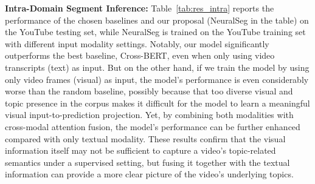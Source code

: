 \documentclass[runningheads]{llncs}
\begin{document}
\textbf{Intra-Domain Segment Inference: }Table~\ref{tab:res_intra} reports the performance of the chosen
baselines and our proposal (NeuralSeg in the table) on the YouTube testing set, while
NeuralSeg is trained on the YouTube training set with different input modality settings.
Notably, our model significantly outperforms the best baseline, Cross-BERT, even when only using video transcripts (text) as input. But on the other hand, if we train the model by using only video frames (visual) as input, the model’s performance is even considerably worse than the random baseline, possibly because that too diverse visual and topic presence in the corpus makes it difficult for the model to learn a meaningful visual input-to-prediction
projection. Yet, by combining both modalities with cross-modal attention fusion, the model’s performance can be further enhanced compared with only textual
modality. These results confirm that the visual information itself may not be sufficient to capture a video’s topic-related semantics under a supervised setting, but fusing it
together with the textual information can provide a more clear picture of the video’s
underlying topics.
\end{document}
